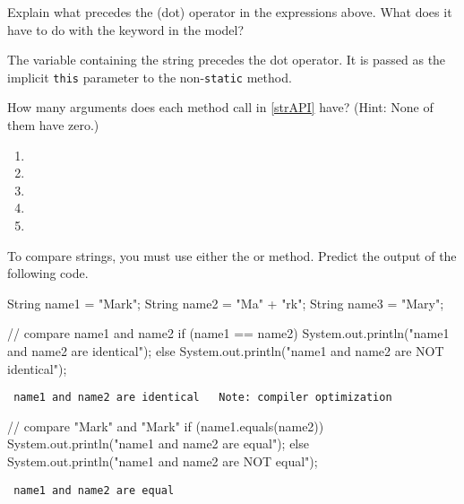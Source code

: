 \Q Explain what precedes the  (dot) operator in the expressions above.
What does it have to do with the keyword  in the model?

\begin{answer}
The variable containing the string precedes the dot operator. It is passed as the implicit {\tt this} parameter to the non-{\tt static} method.
\end{answer}


\Q How many arguments does each method call in \ref{strAPI} have?
(Hint: None of them have zero.)

\begin{multicols}{2}
\begin{enumerate}
\item {}
\item {}
\item {}
\item {}
\item {}
\end{enumerate}
\end{multicols}


\Q To compare strings, you must use either the  or  method.
Predict the output of the following code.

\begin{javalst}
String name1 = "Mark";
String name2 = "Ma" + "rk";
String name3 = "Mary";

// compare name1 and name2
if (name1 == name2) {
    System.out.println("name1 and name2 are identical");
} else {
    System.out.println("name1 and name2 are NOT identical");
}
\end{javalst}

\vspace{-3ex}
\begin{answer}[1em]
\tt \hspace{1em} name1 and name2 are identical ~ \normalfont Note: compiler optimization
\end{answer}

\begin{javalst}
// compare "Mark" and "Mark"
if (name1.equals(name2)) {
    System.out.println("name1 and name2 are equal");
} else {
    System.out.println("name1 and name2 are NOT equal");
}
\end{javalst}

\vspace{-3ex}
\begin{answer}[1em]
\tt \hspace{1em} name1 and name2 are equal
\end{answer}

